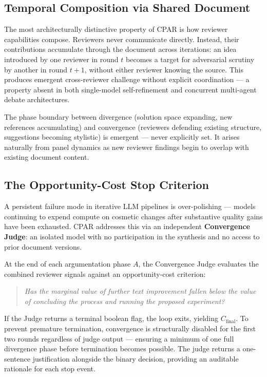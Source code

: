 \documentclass[11pt, a4paper]{article}
\begin{document}
\subsection{Temporal Composition via Shared Document}
\label{sec:temporal_comp}

The most architecturally distinctive property of CPAR is how reviewer capabilities compose. Reviewers never communicate directly. Instead, their contributions accumulate through the document across iterations: an idea introduced by one reviewer in round $t$ becomes a target for adversarial scrutiny by another in round $t+1$, without either reviewer knowing the source. This produces emergent cross-reviewer challenge without explicit coordination --- a property absent in both single-model self-refinement and concurrent multi-agent debate architectures.

The phase boundary between divergence (solution space expanding, new references accumulating) and convergence (reviewers defending existing structure, suggestions becoming stylistic) is emergent --- never explicitly set. It arises naturally from panel dynamics as new reviewer findings begin to overlap with existing document content.

\subsection{The Opportunity-Cost Stop Criterion}
\label{sec:opportunity_cost}

A persistent failure mode in iterative LLM pipelines is over-polishing --- models continuing to expend compute on cosmetic changes after substantive quality gains have been exhausted. CPAR addresses this via an independent \textbf{Convergence Judge}: an isolated model with no participation in the synthesis and no access to prior document versions.

At the end of each argumentation phase $A$, the Convergence Judge evaluates the combined reviewer signals against an opportunity-cost criterion:

\begin{quote}
\textit{Has the marginal value of further text improvement fallen below the value of concluding the process and running the proposed experiment?}
\end{quote}

If the Judge returns a terminal boolean flag, the loop exits, yielding $C_{\text{final}}$. To prevent premature termination, convergence is structurally disabled for the first two rounds regardless of judge output --- ensuring a minimum of one full divergence phase before termination becomes possible. The judge returns a one-sentence justification alongside the binary decision, providing an auditable rationale for each stop event.
\end{document}
